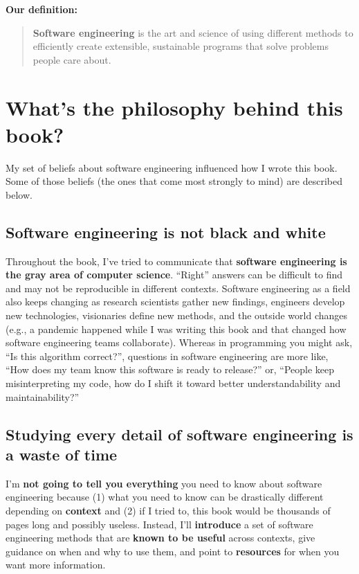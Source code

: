 \spacer
\textbf{Our definition:}

\begin{quote}
\textbf{Software engineering} is the art and science of using different methods to efficiently create extensible, sustainable programs that solve problems people care about.
\end{quote}

\section{What's the philosophy behind this book?}

My set of beliefs about software engineering influenced how I wrote this book. Some of those beliefs (the ones that come most strongly to mind) are described below.

\subsection{Software engineering is not black and white}
Throughout the book, I've tried to communicate that \textbf{software engineering is the gray area of computer science}. ``Right'' answers can be difficult to find and may not be reproducible in different contexts. Software engineering as a field also keeps changing as research scientists gather new findings, engineers develop new technologies, visionaries define new methods, and the outside world changes (e.g., a pandemic happened while I was writing this book and that changed how software engineering teams collaborate). Whereas in programming you might ask, ``Is this algorithm correct?'', questions in software engineering are more like, ``How does my team know this software is ready to release?'' or, ``People keep misinterpreting my code, how do I shift it toward better understandability and maintainability?''

\subsection{Studying every detail of software engineering is a waste of time}\marginpar{\agileDef\margindivider}\marginpar{\softwareProcessModelDef\margindivider}\marginpar{\iterationDef\margindivider}\marginpar{\incrementDef}
I'm \textbf{not going to tell you everything} you need to know about software engineering because (1) what you need to know can be drastically different depending on \textbf{context} and (2) if I tried to, this book would be thousands of pages long and possibly useless. Instead, I'll \textbf{introduce} a set of software engineering methods that are \textbf{known to be useful} across contexts, give guidance on when and why to use them, and point to \textbf{resources} for when you want more information.

